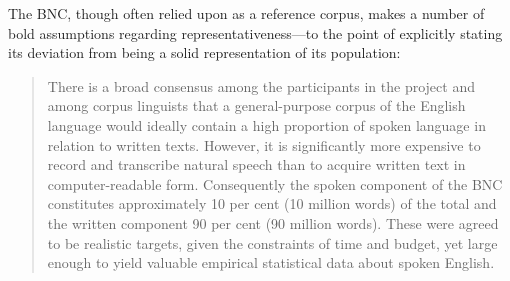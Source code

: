 


% 
% 
% 


The BNC, though often relied upon as a reference corpus, makes a number of bold assumptions regarding representativeness---to the point of explicitly stating its deviation from being a solid representation of its population\cite[p.6]{lou1995users}:

\begin{quote}
There is a broad consensus among the participants in the project and among corpus linguists that a general-purpose corpus of the English language would ideally contain a high proportion of spoken language in relation to written texts. However, it is significantly more expensive to record and transcribe natural speech than to acquire written text in computer-readable form. Consequently the spoken component of the BNC constitutes approximately 10 per cent (10 million words) of the total and the written component 90 per cent (90 million words). These were agreed to be realistic targets, given the constraints of time and budget, yet large enough to yield valuable empirical statistical data about spoken English.
\end{quote}

